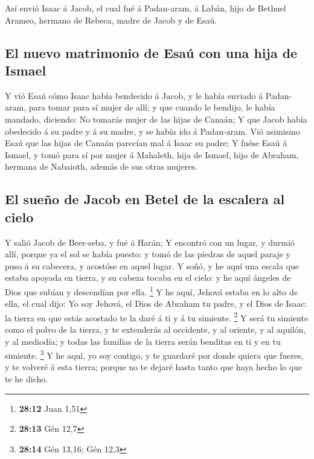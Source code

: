  Así envió Isaac á Jacob, el cual fué á Padan-aram, á
Labán, hijo de Bethuel Arameo, hermano de Rebeca, madre de Jacob y de
Esaú.

\hypertarget{el-nuevo-matrimonio-de-esauxfa-con-una-hija-de-ismael}{%
\subsection{El nuevo matrimonio de Esaú con una hija de
Ismael}\label{el-nuevo-matrimonio-de-esauxfa-con-una-hija-de-ismael}}

 Y vió Esaú cómo Isaac había bendecido á Jacob, y le había
enviado á Padan-aram, para tomar para sí mujer de allí; y que cuando le
bendijo, le había mandado, diciendo: No tomarás mujer de las hijas de
Canaán;  Y que Jacob había obedecido á su padre y á su
madre, y se había ido á Padan-aram.  Vió asimismo Esaú que
las hijas de Canaán parecían mal á Isaac su padre;  Y
fuése Esaú á Ismael, y tomó para sí por mujer á Mahaleth, hija de
Ismael, hijo de Abraham, hermana de Nabaioth, además de sus otras
mujeres.

\hypertarget{el-sueuxf1o-de-jacob-en-betel-de-la-escalera-al-cielo}{%
\subsection{El sueño de Jacob en Betel de la escalera al
cielo}\label{el-sueuxf1o-de-jacob-en-betel-de-la-escalera-al-cielo}}

 Y salió Jacob de Beer-seba, y fué á Harán;
 Y encontró con un lugar, y durmió allí, porque ya el sol
se había puesto: y tomó de las piedras de aquel paraje y puso á su
cabecera, y acostóse en aquel lugar.  Y soñó, y he aquí
una escala que estaba apoyada en tierra, y su cabeza tocaba en el cielo:
y he aquí ángeles de Dios que subían y descendían por ella. \footnote{\textbf{28:12}
  Juan 1,51}  Y he aquí, Jehová estaba en lo alto de
ella, el cual dijo: Yo soy Jehová, el Dios de Abraham tu padre, y el
Dios de Isaac: la tierra en que estás acostado te la daré á ti y á tu
simiente. \footnote{\textbf{28:13} Gén 12,7}  Y será tu
simiente como el polvo de la tierra, y te extenderás al occidente, y al
oriente, y al aquilón, y al mediodía; y todas las familias de la tierra
serán benditas en ti y en tu simiente. \footnote{\textbf{28:14} Gén
  13,16; Gén 12,3}  Y he aquí, yo soy contigo, y te
guardaré por donde quiera que fueres, y te volveré á esta tierra; porque
no te dejaré hasta tanto que haya hecho lo que te he dicho.

